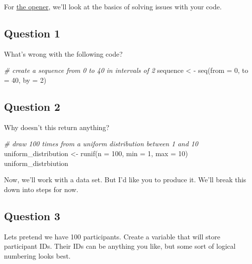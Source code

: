 \documentclass[
]{book}
\newenvironment{Shaded}{\begin{snugshade}}{\end{snugshade}}
\newcommand{\AttributeTok}[1]{\textcolor[rgb]{0.77,0.63,0.00}{#1}}
\newcommand{\CommentTok}[1]{\textcolor[rgb]{0.56,0.35,0.01}{\textit{#1}}}
\newcommand{\DecValTok}[1]{\textcolor[rgb]{0.00,0.00,0.81}{#1}}
\newcommand{\FunctionTok}[1]{\textcolor[rgb]{0.00,0.00,0.00}{#1}}
\newcommand{\NormalTok}[1]{#1}
\newcommand{\OtherTok}[1]{\textcolor[rgb]{0.56,0.35,0.01}{#1}}
\newcommand{\SpecialCharTok}[1]{\textcolor[rgb]{0.00,0.00,0.00}{#1}}
\begin{document}
For \href{https://youtu.be/yOI8NGJ6SdI}{the opener}, we'll look at the basics of solving issues with your code.

\hypertarget{question-1}{%
\subsection{Question 1}\label{question-1}}

What's wrong with the following code?

\begin{Shaded}
\begin{Highlighting}[]
\CommentTok{\# create a sequence from 0 to 40 in intervals of 2}
\NormalTok{sequence }\SpecialCharTok{\textless{}} \SpecialCharTok{{-}} \FunctionTok{seq}\NormalTok{(}\AttributeTok{from =} \DecValTok{0}\NormalTok{, }\AttributeTok{to =} \DecValTok{40}\NormalTok{, }\AttributeTok{by =} \DecValTok{2}\NormalTok{)}
\end{Highlighting}
\end{Shaded}

\hypertarget{question-2}{%
\subsection{Question 2}\label{question-2}}

Why doesn't this return anything?

\begin{Shaded}
\begin{Highlighting}[]
\CommentTok{\# draw 100 times from a uniform distribution between 1 and 10}
\NormalTok{uniform\_distribution }\OtherTok{\textless{}{-}} \FunctionTok{runif}\NormalTok{(}\AttributeTok{n =} \DecValTok{100}\NormalTok{, }\AttributeTok{min =} \DecValTok{1}\NormalTok{, }\AttributeTok{max =} \DecValTok{10}\NormalTok{)}
\NormalTok{uniform\_distrbiution}
\end{Highlighting}
\end{Shaded}

Now, we'll work with a data set. But I'd like you to produce it. We'll break this down into steps for now.

\hypertarget{question-3}{%
\subsection{Question 3}\label{question-3}}

Lets pretend we have 100 participants. Create a variable that will store participant IDs. Their IDs can be anything you like, but some sort of logical numbering looks best.
\end{document}
